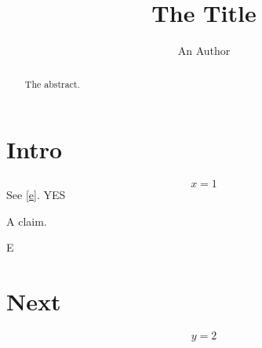 \documentclass[copyoption]{svjour3}
\title{The Title}
\author{An Author}
\institute{The Institute}
\begin{document}
\maketitle
\begin{abstract}The abstract.\end{abstract}
\section{Intro}
\begin{equation}x=1\label{e}\end{equation}
See \ref{e}. \ifextraflag YES\fi{} \theextractr{} \copyoptionseen
\begin{extrathm}A claim.\end{extrathm}
\begin{extraenv}E\end{extraenv}  \aeocextra
\section{Next}
\begin{equation}y=2\end{equation}
\end{document}
